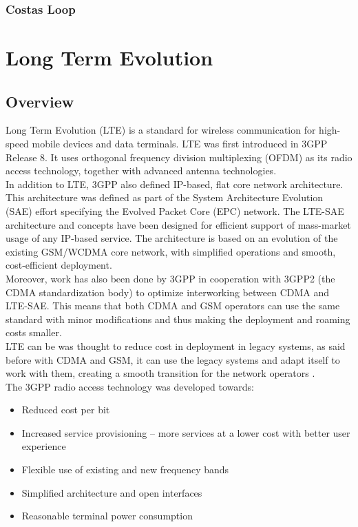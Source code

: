 \subsubsection{Costas Loop}


\section{Long Term Evolution}

\subsection{Overview}

Long Term Evolution (LTE) is a standard for wireless communication for high-speed
mobile devices and data terminals. LTE was first introduced in 3GPP Release 8.
It uses orthogonal frequency division multiplexing (OFDM) as its radio access
technology, together with advanced antenna technologies.\\

In addition to LTE, 3GPP also defined IP-based, flat core network architecture.
This architecture was defined as part of the System Architecture Evolution (SAE)
effort specifying the Evolved Packet Core (EPC) network. The LTE-SAE architecture
and concepts have been designed for efficient support of mass-market usage of any
IP-based service. The architecture is based on an evolution of the existing GSM/WCDMA
core network, with simplified operations and smooth, cost-efficient deployment.\\

Moreover, work has also been done by 3GPP in cooperation with 3GPP2 (the CDMA
standardization body) to optimize interworking between CDMA and LTE-SAE. This means
that both CDMA and GSM operators can use the same standard with minor modifications
and thus making the deployment and roaming costs smaller.\\

LTE can be was thought to reduce cost in deployment in legacy systems, as said
before with CDMA and GSM, it can use the legacy systems and adapt itself to work
with them, creating a smooth transition for the network operators \cite{introlte}.\\

The 3GPP radio access  technology was developed towards:

\begin{itemize}
    \item Reduced cost per bit
    \item Increased service provisioning – more services at a lower cost with
    better user experience
    \item Flexible use of existing and new frequency bands
    \item Simplified architecture and open interfaces
    \item Reasonable terminal power consumption
\end{itemize}

